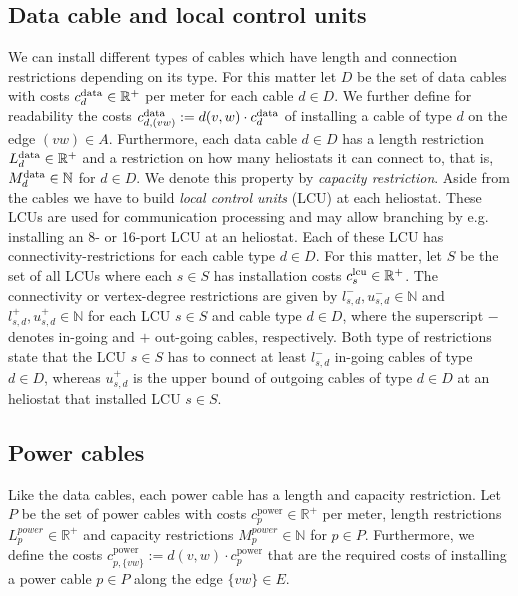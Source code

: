 \subsection{Data cable and local control units}
  We can install different types of cables which have length and connection restrictions depending on its type. For this matter let $D$ be the set of data cables with costs $c_d^\text{data}\in\mathbb{R}^+$ per meter for each cable $d\in D$. We further define for readability the costs $c_{d,(vw)}^\text{data}:=d(v,w)\cdot c_d^\text{data}$ of installing a cable of type $d$ on the edge $(vw)\in A$. Furthermore, each data cable $d\in D$ has a length restriction $L_d^\text{data}\in\mathbb{R}^+$ and a restriction on how many heliostats it can connect to, that is, $M_d^\text{data}\in\mathbb{N}$ for $d\in D$. We denote this property by \emph{capacity restriction}.
  \emptyline
  Aside from the cables we have to build \emph{local control units} (LCU) at each heliostat. These LCUs are used for communication processing and may allow branching by e.g. installing an 8- or 16-port LCU at an heliostat. Each of these LCU has connectivity-restrictions for each cable type $d\in D$. For this matter, let $S$ be the set of all LCUs where each $s\in S$ has installation costs $c_{s}^\text{lcu}\in\mathbb{R}^+$. The connectivity or vertex-degree restrictions are given by $l^-_{s,d}, u^-_{s,d}\in\mathbb{N}$ and $l^+_{s,d}, u^+_{s,d}\in\mathbb{N}$ for each LCU $s\in S$ and cable type $d\in D$, where the superscript $-$ denotes in-going and $+$ out-going cables, respectively. Both type of restrictions state that the LCU $s\in S$ has to connect at least $l^-_{s,d}$ in-going cables of type $d\in D$, whereas $u^+_{s,d}$ is the upper bound of outgoing cables of type $d\in D$ at an heliostat that installed LCU $s\in S$.

\newcommand*{\powercost}{c_p^\text{power}}
\newcommand*{\powertotalcost}{c_{p,\{vw\}}^\text{power}}
\newcommand*{\powerlength}{L_p^\text{power}}
\newcommand*{\powercapacity}{M_p^\text{power}}
\subsection{Power cables}
Like the data cables, each power cable has a length and capacity restriction. Let $P$ be the set of power cables with costs $\powercost\in\mathbb{R}^+$ per meter, length restrictions $L_p^{power}\in\mathbb{R}^+$ and capacity restrictions $M_p^{power}\in\mathbb{N}$ for $p\in P$. Furthermore, we define the costs $\powertotalcost:=d(v,w)\cdot\powercost$ that are the required costs of installing a power cable $p\in P$ along the edge $\{vw\}\in E$.

